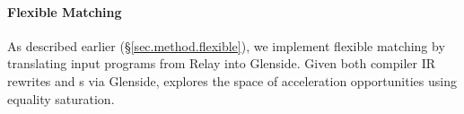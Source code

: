 
\paragraph{Flexible Matching}
As described earlier (\S\ref{sec.method.flexible}),
  we implement flexible matching
  by translating input
  programs from Relay
  into Glenside.
Given both compiler IR rewrites and 
{\mapping}s %
via Glenside, \egg explores the space of acceleration opportunities using equality saturation.
%
%
%


